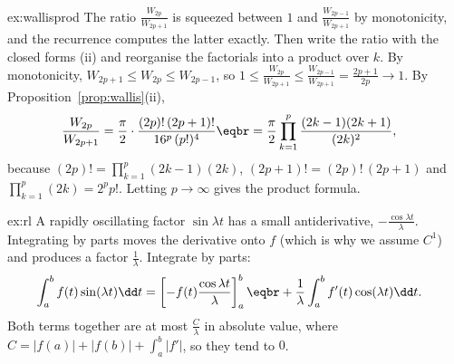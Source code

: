 \begin{solution}{ex:wallisprod}
\idea The ratio $\frac{W_{2p}}{W_{2p+1}}$ is squeezed between $1$ and $\frac{W_{2p-1}}{W_{2p+1}}$ by monotonicity, and the recurrence computes the latter exactly. Then write the ratio with the closed forms (ii) and reorganise the factorials into a product over $k$.
\writeup By monotonicity, $W_{2p+1}\le W_{2p}\le W_{2p-1}$, so $1\le\frac{W_{2p}}{W_{2p+1}}\le\frac{W_{2p-1}}{W_{2p+1}}=\frac{2p+1}{2p}\to1$. By Proposition~\ref{prop:wallis}(ii),
\[
\begin{aligned}\frac{W_{2p}}{W_{2p+1}}&=\frac\pi2\cdot\frac{(2p)!\,(2p+1)!}{16^p\,(p!)^4}\eqbr=\frac\pi2\prod_{k=1}^p\frac{(2k-1)(2k+1)}{(2k)^2},\end{aligned}
\]
because $(2p)!=\prod_{k=1}^p(2k-1)(2k)$, $(2p+1)!=(2p)!\,(2p+1)$ and $\prod_{k=1}^p(2k)=2^pp!$. Letting $p\to\infty$ gives the product formula.
\end{solution}

\begin{solution}{ex:rl}
\idea A rapidly oscillating factor $\sin\lambda t$ has a small antiderivative, $-\frac{\cos\lambda t}\lambda$. Integrating by parts moves the derivative onto $f$ (which is why we assume $C^1$) and produces a factor $\frac1\lambda$.
\writeup Integrate by parts:
\[\begin{aligned}\int_a^bf(t)\sin(\lambda t)\dd t&=\left[-f(t)\frac{\cos\lambda t}\lambda\right]_a^b\eqbr+\frac1\lambda\int_a^bf'(t)\cos(\lambda t)\dd t.\end{aligned}\]
Both terms together are at most $\frac C\lambda$ in absolute value, where $C=|f(a)|+|f(b)|+\int_a^b|f'|$, so they tend to $0$.
\end{solution}

